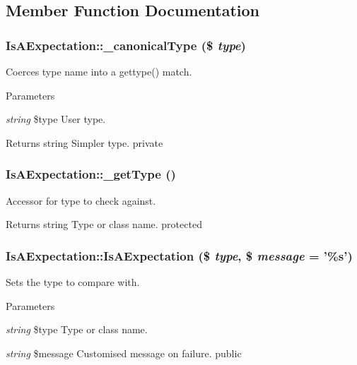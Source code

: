 \subsection{Member Function Documentation}
\hypertarget{class_is_a_expectation_a3026f90a740bb4ab282b98e22a96d01e}{
\subsubsection[{\_\-canonicalType}]{\setlength{\rightskip}{0pt plus 5cm}IsAExpectation::\_\-canonicalType (\$ {\em type})}}
\label{class_is_a_expectation_a3026f90a740bb4ab282b98e22a96d01e}
Coerces type name into a gettype() match. 
\begin{DoxyParams}{Parameters}
\item[{\em string}]\$type User type. \end{DoxyParams}
\begin{DoxyReturn}{Returns}
string Simpler type.  private 
\end{DoxyReturn}
\hypertarget{class_is_a_expectation_adac32cda7734913a99895e0c39461822}{
\subsubsection[{\_\-getType}]{\setlength{\rightskip}{0pt plus 5cm}IsAExpectation::\_\-getType ()}}
\label{class_is_a_expectation_adac32cda7734913a99895e0c39461822}
Accessor for type to check against. \begin{DoxyReturn}{Returns}
string Type or class name.  protected 
\end{DoxyReturn}
\hypertarget{class_is_a_expectation_a7b8cdc05b6aff778baadf80c6835fba9}{
\subsubsection[{IsAExpectation}]{\setlength{\rightskip}{0pt plus 5cm}IsAExpectation::IsAExpectation (\$ {\em type}, \/  \$ {\em message} = {\ttfamily '\%s'})}}
\label{class_is_a_expectation_a7b8cdc05b6aff778baadf80c6835fba9}
Sets the type to compare with. 
\begin{DoxyParams}{Parameters}
\item[{\em string}]\$type Type or class name. \item[{\em string}]\$message Customised message on failure.  public \end{DoxyParams}
